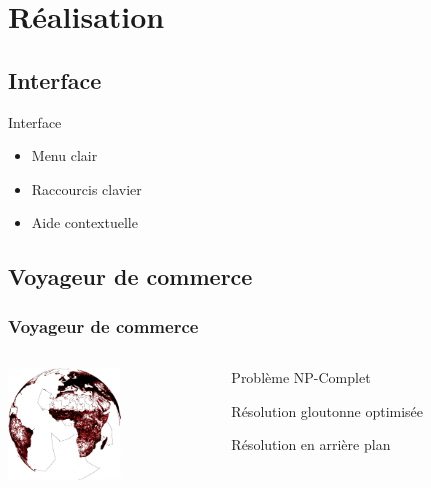 \documentclass{beamer}
\begin{document}
\section{Réalisation}
    \subsection{Interface}
        \begin{frame}{Interface}
            \begin{itemize}
	            \item Menu clair
	            \item Raccourcis clavier
	            \item Aide contextuelle
            \end{itemize}
        \end{frame}
    \subsection{Voyageur de commerce}
    \begin{frame}
        \frametitle{Voyageur de commerce}
        \begin{columns}
            \begin{column}{0cm}
                \includegraphics[width=3cm]{images/wts.jpg}
            \end{column}
            \begin{column}{8cm}
                \begin{description}\itemsep15pt
                    \item Problème NP-Complet
                    \item Résolution gloutonne optimisée
                    \item Résolution en arrière plan
                \end{description}
            \end{column}
        \end{columns}
    \end{frame}
\end{document}
